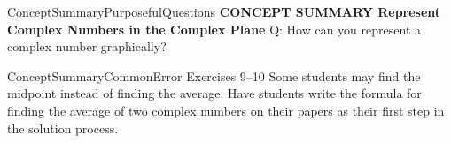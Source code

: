 \documentclass{article}
\newenvironment{te-addendum}[2]{}{}     %
\newcommand{\answer}[1]{}               %
\newcommand{\te}[1]{}                   %
\begin{document}
\begin{te-addendum}{ConceptSummary}{PurposefulQuestions}
\textbf{CONCEPT SUMMARY Represent Complex Numbers in the Complex Plane}
Q: How can you represent a complex number graphically?
\answer{On a complex plane, graph the real part along the horizontal axis and the imaginary part along the vertical axis.}
\te{Concept Summary, Do You Understand, and Do You Know How are available at SavvasRealize.com. Presentation. Practice.}
\end{te-addendum}
\begin{te-addendum}{ConceptSummary}{CommonError}
Exercises 9--10 Some students may find the midpoint instead of finding the average. Have students write the formula for finding the average of two complex numbers on their papers as their first step in the solution process.
\end{te-addendum}
\end{document}
